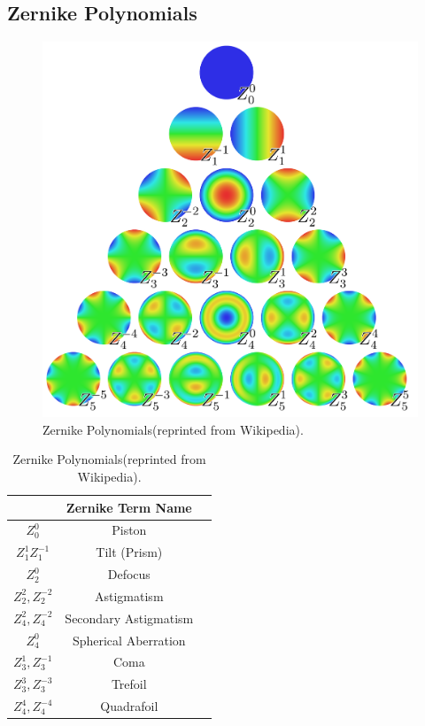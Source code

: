 \documentclass{article}
\begin{document}
\subsection{Zernike Polynomials}

\begin{figure}
  \centering
    \includegraphics[width=1\linewidth]{Zernike_polynomials2.png}
  \caption{Zernike Polynomials(reprinted from Wikipedia).}
  \label{fig:zps}
\end{figure}


\begin{table}[htbp]
	\centering
	\begin{tabular}{ccc}
	& Zernike Term	Name \\ \hline
	$Z^0_0$	&	Piston \\
	$Z^1_1 Z^{-1}_1$	&	Tilt (Prism) \\
	$Z^0_2$	&	Defocus \\
	$Z^2_2, Z^{-2}_2$	&	Astigmatism \\
	$Z^2_4, Z^{-2}_4$	&	Secondary Astigmatism \\
	$Z^0_4$	&	Spherical Aberration \\
	$Z^1_3,Z^{-1}_3$	&	Coma \\
	$Z^3_3, Z^{-3}_3$	&	Trefoil \\
	$Z^4_4, Z^{-4}_4$	&	Quadrafoil \\
    \end{tabular}
      \caption{Zernike Polynomials(reprinted from Wikipedia).}
      \label{table:Low Order ZPs }
\end{table}
\end{document}
